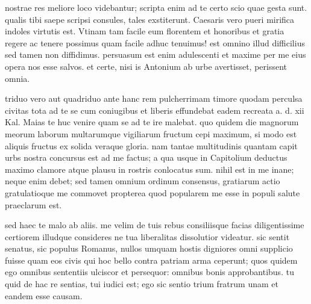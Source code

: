 


 nostrae res meliore loco videbantur; scripta enim ad te certo scio quae gesta sunt. qualis tibi saepe scripsi consules, tales exstiterunt. Caesaris vero pueri mirifica indoles virtutis est. Vtinam tam facile eum florentem et honoribus et gratia regere ac tenere possimus quam facile adhuc tenuimus! est omnino illud difficilius sed tamen non diffidimus. persuasum est enim adulescenti et maxime per me eius opera nos esse salvos. et certe, nisi is Antonium ab urbe avertisset, perissent omnia.

 triduo vero aut quadriduo ante hanc rem pulcherrimam timore quodam perculsa civitas tota ad te se cum coniugibus et liberis effundebat eadem recreata a. d. xii Kal. Maias te huc venire quam se ad te ire malebat. quo quidem die magnorum meorum laborum multarumque vigiliarum fructum cepi maximum, si modo est aliquis fructus ex solida veraque gloria. nam tantae multitudinis quantam capit urbs nostra concursus est ad me factus; a qua usque in Capitolium deductus maximo clamore atque plausu in rostris conlocatus sum. nihil est in me inane; neque enim debet; sed tamen omnium ordinum consensus, gratiarum actio gratulatioque me commovet propterea quod popularem me esse in populi salute praeclarum est.

 sed haec te malo ab aliis. me velim de tuis rebus consiliisque facias diligentissime certiorem illudque consideres ne tua liberalitas dissolutior videatur. sic sentit senatus, sic populus Romanus, nullos umquam hostis digniores omni supplicio fuisse quam eos civis qui hoc bello contra patriam arma ceperunt; quos quidem ego omnibus sententiis ulciscor et persequor: omnibus bonis approbantibus. tu quid de hac re sentias, tui iudici est; ego sic sentio trium fratrum unam et eandem esse causam.
